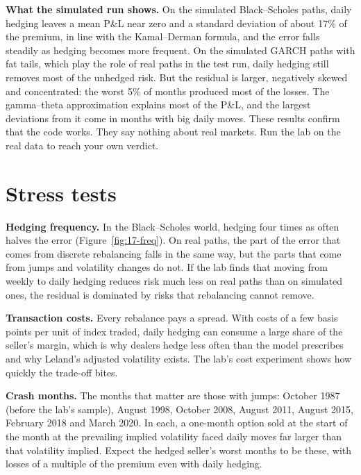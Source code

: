 \textbf{What the simulated run shows.} On the simulated Black--Scholes paths, daily hedging leaves a mean P\&L near zero and a standard deviation of about 17\% of the premium, in line with the Kamal--Derman formula, and the error falls steadily as hedging becomes more frequent. On the simulated GARCH paths with fat tails, which play the role of real paths in the test run, daily hedging still removes most of the unhedged risk. But the residual is larger, negatively skewed and concentrated: the worst 5\% of months produced most of the losses. The gamma--theta approximation explains most of the P\&L, and the largest deviations from it come in months with big daily moves. These results confirm that the code works. They say nothing about real markets. Run the lab on the real data to reach your own verdict.

\section{Stress tests}
\label{sec:17-stress}

\textbf{Hedging frequency.} In the Black--Scholes world, hedging four times as often halves the error (Figure~\ref{fig:17-freq}). On real paths, the part of the error that comes from discrete rebalancing falls in the same way, but the parts that come from jumps and volatility changes do not. If the lab finds that moving from weekly to daily hedging reduces risk much less on real paths than on simulated ones, the residual is dominated by risks that rebalancing cannot remove.

\textbf{Transaction costs.} Every rebalance pays a spread. With costs of a few basis points per unit of index traded, daily hedging can consume a large share of the seller's margin, which is why dealers hedge less often than the model prescribes and why Leland's adjusted volatility exists. The lab's cost experiment shows how quickly the trade-off bites.

\textbf{Crash months.} The months that matter are those with jumps: October 1987 (before the lab's sample), August 1998, October 2008, August 2011, August 2015, February 2018 and March 2020. In each, a one-month option sold at the start of the month at the prevailing implied volatility faced daily moves far larger than that volatility implied. Expect the hedged seller's worst months to be these, with losses of a multiple of the premium even with daily hedging.


